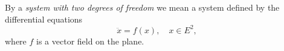 By a \textit{system with two degrees of freedom} we mean a system defined by the differential equations
$$\ddot{x} = f(x), \quad x \in E^2,$$
where $f$ is a vector field on the plane.
